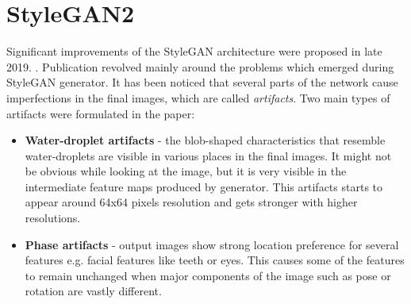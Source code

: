 \documentclass[11pt,a4paper,openany]{book}
\begin{document}




\section{StyleGAN2}

\noindent Significant improvements of the StyleGAN architecture were proposed in late 2019. \cite{stylegan2}. Publication revolved mainly around the problems which emerged during StyleGAN generator. It has been noticed that several parts of the network cause imperfections in the final images, which are called \textit{artifacts}. Two main types of artifacts were formulated in the paper:

\begin{itemize}
\item \textbf{Water-droplet artifacts} - the blob-shaped characteristics that resemble water-droplets are visible in various places in the final images. It might not be obvious while looking at the image, but it is very visible in the intermediate feature maps produced by generator. This artifacts starts to appear around 64x64 pixels resolution and gets stronger with higher resolutions. 
\item \textbf{Phase artifacts} - output images show strong location preference for several features e.g. facial features like teeth or eyes. This causes some of the features to remain unchanged when major components of the image such as pose or rotation are vastly different.
\end{itemize}
\end{document}
